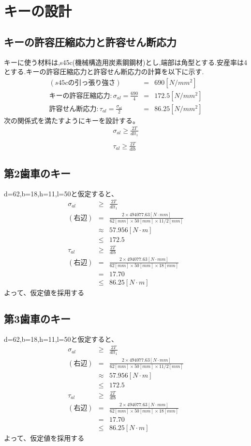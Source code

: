 \documentclass[a4j,twoside,openright,11pt]{jreport}
\begin{document}
\section{キーの設計}
\subsection{キーの許容圧縮応力と許容せん断応力}
キーに使う材料は,s45c(機械構造用炭素鋼鋼材)とし,端部は角型とする.安産率は4とする.キーの許容圧縮応力と許容せん断応力の計算を以下に示す.
\begin{eqnarray}
(s45cの引っ張り強さ)&=&690[N/mm^2]\\
キーの許容圧縮応力:\sigma_{al} = \frac{690}{4} &=& 172.5[N/mm^2]\\
許容せん断応力:\tau_{al}=\frac{\sigma_{al}}{2} &=& 86.25[N/mm^2]
\end{eqnarray}
次の関係式を満たすようにキーを設計する。
\begin{eqnarray}
\sigma_{al} \geq \frac{2T}{dlt_1}\\
\nonumber\\
\tau_{al} \geq \frac{2T}{dlb}
\end{eqnarray}
\subsection{第2歯車のキー}
d=62,b=18,h=11,l=50と仮定すると、
\begin{eqnarray}
\sigma_{al} &\geq& \frac{2T}{dlt_1}\\
(右辺) &=& \frac{2 \times 494077.63[N \cdot mm]}{62[mm] \times 50[mm] \times 11/2[mm]}\\
       &\approx&57.956[N \cdot m]\\
       &\leq& 172.5\\
\tau_{al} &\geq& \frac{2T}{dlb}\\
(右辺) &=& \frac{2 \times 494077.63[N \cdot mm]}{62[mm] \times 50[mm] \times 18[mm]}\\
       &=& 17.70\\
       &\leq&86.25[N \cdot m]
\end{eqnarray}
よって、仮定値を採用する
\subsection{第3歯車のキー}
d=62,b=18,h=11,l=50と仮定すると、
\begin{eqnarray}
\sigma_{al} &\geq& \frac{2T}{dlt_1}\\
(右辺) &=& \frac{2 \times 494077.63[N \cdot mm]}{62[mm] \times 50[mm] \times 11/2[mm]}\\
       &\approx&57.956[N \cdot m]\\
       &\leq& 172.5\\
\tau_{al} &\geq& \frac{2T}{dlb}\\
(右辺) &=& \frac{2 \times 494077.63[N \cdot mm]}{62[mm] \times 50[mm] \times 18[mm]}\\
       &=& 17.70\\
       &\leq&86.25[N \cdot m]
\end{eqnarray}
よって、仮定値を採用する
\end{document}
